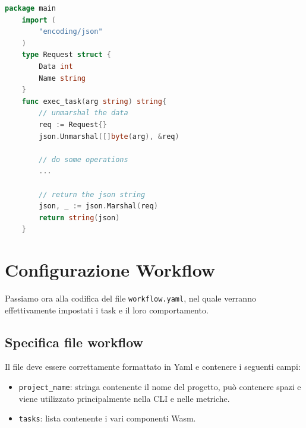 \begin{lstlisting}[language=Go, caption={Task file ed integrazione con Json}, captionpos=b, label={code:task_file_json}, keepspaces=true]
    package main
    import (
        "encoding/json"
    )
    type Request struct {
        Data int
        Name string
    }
    func exec_task(arg string) string{
        // unmarshal the data
        req := Request{}
        json.Unmarshal([]byte(arg), &req)
    
        // do some operations
        ...
        
        // return the json string
        json, _ := json.Marshal(req)
        return string(json)
    }
\end{lstlisting}

\section{Configurazione Workflow}

Passiamo ora alla codifica del file \texttt{workflow.yaml}, nel quale verranno effettivamente impostati i task e il loro comportamento. 

\subsection{Specifica file workflow}

Il file deve essere correttamente formattato in Yaml e contenere i seguenti campi:
\begin{itemize}
    \item \texttt{project\_name}: stringa contenente il nome del progetto, può contenere spazi e viene utilizzato principalmente nella CLI e nelle metriche.
    \item \texttt{tasks}: lista contenente i vari componenti Wasm.
\end{itemize}

